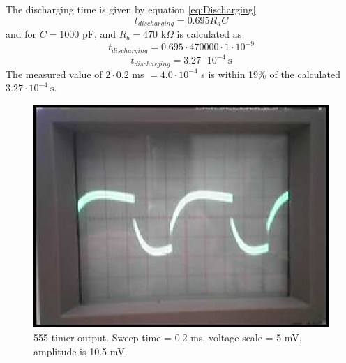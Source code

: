 \documentclass[11pt,onecolumn,letter]{article}
\begin{document}
The discharging time is given by equation \ref{eq:Discharging}
%
%
\begin{equation}\label{eq:Discharging}
t_{discharging} = 0.695 R_a C
\end{equation}
and for $C = 1000$ pF, and $R_b = 470$ k$\Omega$ is calculated as
\begin{displaymath}
t_{discharging} = 0.695 \cdot 470000 \cdot 1 \cdot 10^{-9}
\end{displaymath}
\begin{displaymath}
t_{discharging} = 3.27 \cdot 10^{-4}\ \mathrm{s}
\end{displaymath}
The measured value of $2 \cdot 0.2$ ms $= 4.0 \cdot 10^{-4}$ s is within 19\% of the calculated $3.27 \cdot 10^{-4}\ \mathrm{s}$.
%
%
\begin{figure}
\center
\includegraphics{square.eps}
\caption{555 timer output. Sweep time = 0.2 ms, voltage scale = 5 mV, amplitude is 10.5 mV.}\label{fig:555Square}
\end{figure}
\end{document}
